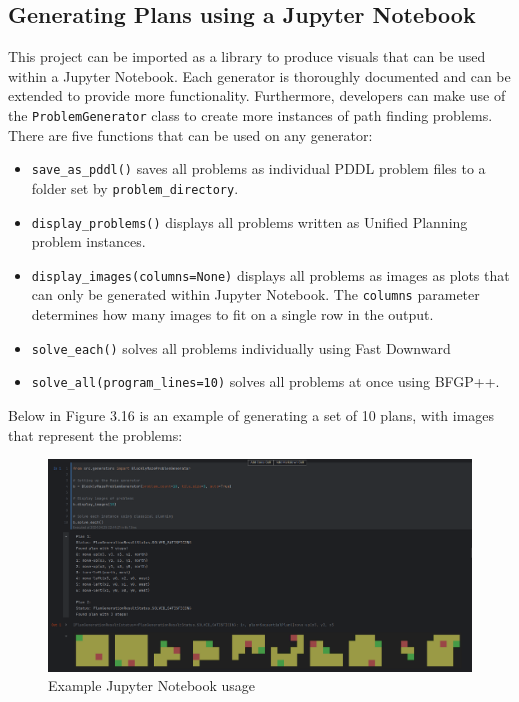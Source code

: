 \subsection{Generating Plans using a Jupyter Notebook}
This project can be imported as a library to produce visuals that can be used within a Jupyter Notebook. Each generator is thoroughly documented and can be extended to provide more functionality. Furthermore, developers can make use of the \texttt{ProblemGenerator} class to create more instances of path finding problems. There are five functions that can be used on any generator:

\begin{itemize}
    \item \texttt{save\_as\_pddl()} saves all problems as individual PDDL problem files to a folder set by \texttt{problem\_directory}.
    \item \texttt{display\_problems()} displays all problems written as Unified Planning problem instances.
    \item \texttt{display\_images(columns=None)} displays all problems as images as plots that can only be generated within Jupyter Notebook. The \texttt{columns} parameter determines how many images to fit on a single row in the output.
    \item \texttt{solve\_each()} solves all problems individually using Fast Downward
    \item \texttt{solve\_all(program\_lines=10)} solves all problems at once using BFGP++.
\end{itemize}
\noindent Below in Figure 3.16 is an example of generating a set of 10 plans, with images that represent the problems:

\begin{figure}[h!]
    \centering
    \includegraphics[width=\textwidth]{images/jupyternotebook.png}
    \caption{Example Jupyter Notebook usage}
\end{figure}


